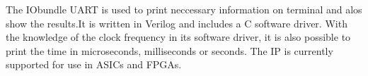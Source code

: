 The IObundle UART is used to print neccessary information on terminal and alos show the results.It is written in Verilog and includes a C software driver. With the knowledge of the clock frequency in its software driver, it is also possible to print the time in microseconds, milliseconds or seconds.  The IP is currently supported for use in ASICs and FPGAs.

